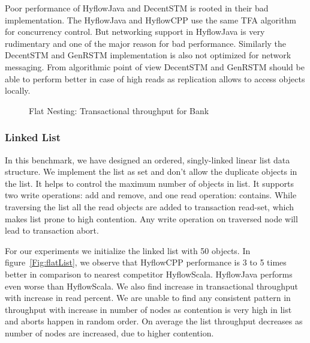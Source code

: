 \documentclass[12pt,english]{report}
\begin{document}
Poor performance of HyflowJava and  DecentSTM is rooted in their bad implementation. The HyflowJava and HyflowCPP use the same TFA algorithm for concurrency control. But networking support in HyflowJava is very rudimentary and one of the major reason for bad performance. Similarly the DecentSTM and GenRSTM implementation is also not optimized for network messaging. From algorithmic point of view DecentSTM and GenRSTM should be able to perform better in case of high reads as replication allows to access objects locally.

\begin{figure}
\centering
{}
\end{figure}
\begin{figure}[H]
\centering
{}
\end{figure}
\begin{figure}[H]
\centering
{}
\end{figure}
\begin{figure}[H]
\centering
{}
\caption{Flat Nesting: Transactional throughput for Bank}
\label{Fig:flatBank}
\end{figure}

\subsubsection{Linked List}

In this benchmark, we have designed an ordered, singly-linked linear list data structure. We implement the list as set and don't allow the duplicate objects in the list. It helps to control the maximum number of objects in list. It supports two write operations: add and remove, and one read operation: contains. While traversing the list all the read objects are added to transaction read-set, which makes list prone to high contention. Any write operation on traversed node will lead to transaction abort.

For our experiments we initialize the linked list with 50 objects. In figure~\ref{Fig:flatList}, we observe that HyflowCPP performance is 3 to 5 times better in comparison to nearest competitor HyflowScala. HyflowJava performs even worse than HyflowScala. We also find increase in transactional throughput with increase in read percent. We are unable to find any consistent pattern in throughput with increase in number of nodes as contention is very high in list and aborts happen in random order. On average the list throughput decreases as number of nodes are increased, due to higher contention.
\end{document}
